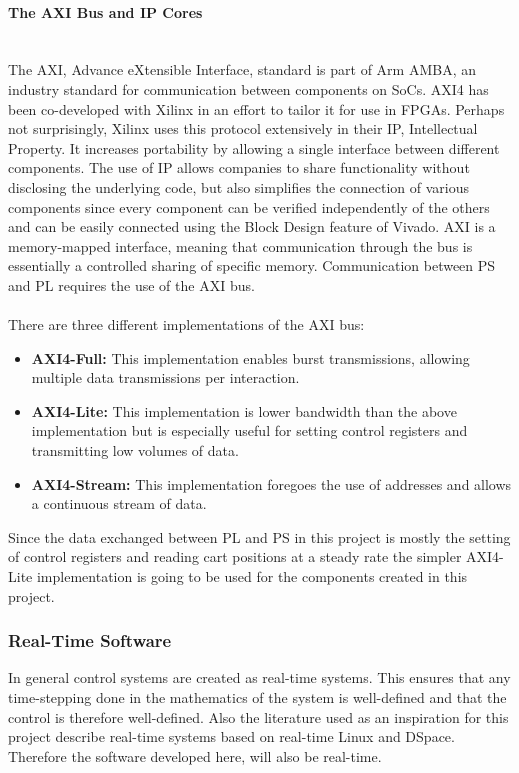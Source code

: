 \paragraph{The AXI Bus and IP Cores}~\\ %
\label{par:the_axi_bus}
The AXI, Advance eXtensible Interface, standard is part of Arm AMBA, an industry standard for communication between components on SoCs.
AXI4 has been co-developed with Xilinx in an effort to tailor it for use in FPGAs.
Perhaps not surprisingly, Xilinx uses this protocol extensively in their IP, Intellectual Property.
It increases portability by allowing a single interface between different components.
The use of IP allows companies to share functionality without disclosing the underlying code, but also simplifies the connection of various components since every component can be verified independently of the others and can be easily connected using the Block Design feature of Vivado.
AXI is a memory-mapped interface, meaning that communication through the bus is essentially a controlled sharing of specific memory.
Communication between PS and PL requires the use of the AXI bus.
\\~\\
There are three different implementations of the AXI bus:
\begin{itemize}
	\item \textbf{AXI4-Full:} This implementation enables burst transmissions, allowing multiple data transmissions per interaction.
	\item \textbf{AXI4-Lite:} This implementation is lower bandwidth than the above implementation but is especially useful for setting control registers and transmitting low volumes of data.
	\item \textbf{AXI4-Stream:} This implementation foregoes the use of addresses and allows a continuous stream of data.
\end{itemize}
Since the data exchanged between PL and PS in this project is mostly the setting of control registers and reading cart positions at a steady rate the simpler AXI4-Lite implementation is going to be used for the components created in this project.
\subsubsection{Real-Time Software} %
\label{ssub:real_time}
In general control systems are created as real-time systems.
This ensures that any time-stepping done in the mathematics of the system is well-defined and that the control is therefore well-defined.
Also the literature used as an inspiration for this project \cite{invertpendulum1} \cite{doubleinvertpendulum} \cite{tripleinvertpendulum} describe real-time systems based on real-time Linux and DSpace.
Therefore the software developed here, will also be real-time.

